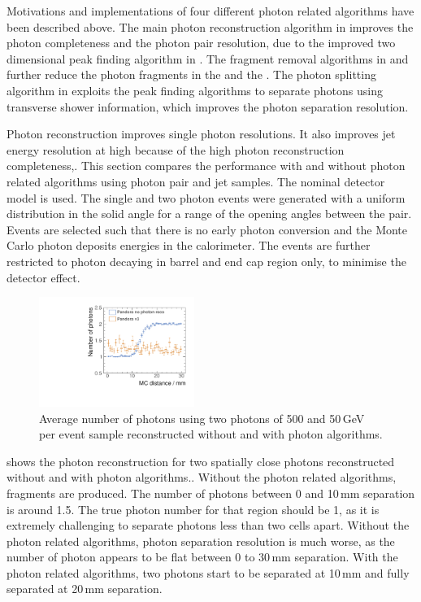 Motivations and implementations of four different photon related algorithms have been described above. The main photon reconstruction algorithm in  improves the photon completeness and the photon pair resolution, due to the improved two dimensional peak finding algorithm in . The fragment removal algorithms in  and  further reduce the photon fragments in the \ECAL and the \HCAL. The photon splitting algorithm in  exploits the peak finding algorithms to separate photons using transverse shower information, which improves the photon separation resolution.

Photon reconstruction improves single photon resolutions. It also improves jet energy resolution at high \sqrtS because of the high photon reconstruction completeness,. This section compares the performance with and without photon related algorithms using photon pair and jet samples. The nominal \ILD detector model is used. The single and two photon events were generated with a uniform distribution in the solid angle for a range of the opening angles between the pair. Events are selected such that there is no early photon conversion and the Monte Carlo photon deposits energies in the calorimeter. The events are further restricted to photon decaying in barrel and end cap region only, to minimise the detector effect.



\begin{figure}[tbph]
\centering
\includegraphics[width=0.45\textwidth]{photon/nPhotonVSnoPhotonReco.pdf}
\caption[Average number of photons using two photons of 500 and 50\,GeV per event sample.]
{Average number of photons using two photons of 500 and 50\,GeV per event sample reconstructed  without and with photon algorithms.}
\label{fig:photonDoublePerformanceNoReco}
\end{figure}

 shows the photon reconstruction for two spatially close photons  reconstructed without and with photon algorithms.. Without the photon related algorithms, fragments are produced.  The number of photons between 0 and 10\,mm separation is around 1.5. The true photon number for that region should be 1, as it is extremely challenging to separate photons less than two cells apart.  Without the photon related algorithms, photon separation resolution is much worse, as the number of photon appears to be flat between 0 to 30\,mm separation. With the photon related algorithms, two photons start to be separated at 10\,mm and fully separated at 20\,mm separation.




